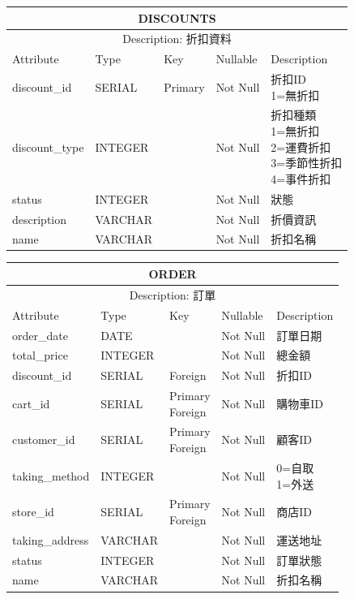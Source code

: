 \documentclass[a4paper, 12pt]{article}
\begin{document}
\noindent\begin{tabular}{ | p{7em} | p{5.5em} | p{5.5em} | p{4.5em} | p{11em} |}
  \hline
  \multicolumn{5}{|c|}{DISCOUNTS} \tabularnewline
  \hline 
  \multicolumn{5}{|c|}{Description: 折扣資料} \tabularnewline
  \hline 
  Attribute & Type & Key & Nullable & Description \\
  \hline
  discount_id & SERIAL & Primary & Not Null & \makecell[l]{折扣ID\\1=無折扣} \\
  \hline
  discount_type & INTEGER &  & Not Null & \makecell[l]{折扣種類\\1=無折扣\\2=運費折扣\\3=季節性折扣\\4=事件折扣} \\
  \hline
  status & INTEGER & &Not Null &狀態\\
  \hline
  description& VARCHAR &  &Not Null &折價資訊\\
  \hline
  name & VARCHAR &  &Not Null &折扣名稱\\
  \hline
\end{tabular}
\vspace{1em}

\noindent\begin{tabular}{ | p{7em} | p{5.5em} | p{5.5em} | p{4.5em} | p{11em} |}
  \hline
  \multicolumn{5}{|c|}{ORDER} \tabularnewline
  \hline 
  \multicolumn{5}{|c|}{Description: 訂單} \tabularnewline
  \hline 
  Attribute & Type & Key & Nullable & Description \\
  \hline
  order_date & DATE &  & Not Null & 訂單日期 \\
  \hline
  total_price & INTEGER &  & Not Null & 總金額 \\
  \hline
  discount_id & SERIAL & Foreign&Not Null &折扣ID\\
  \hline
  cart_id& SERIAL & \makecell[l]{Primary \\ Foreign} &Not Null &購物車ID\\
  \hline
  customer_id & SERIAL & \makecell[l]{Primary \\ Foreign} & Not Null & 顧客ID \\
  \hline
  taking_method & INTEGER &  & Not Null &  \makecell[l]{0=自取\\1=外送}\\
  \hline
  store_id & SERIAL & \makecell[l]{Primary \\ Foreign} & Not Null & 商店ID \\
  \hline
  taking_address & VARCHAR &  & Not Null & 運送地址 \\
  \hline
  status & INTEGER &  & Not Null & 訂單狀態 \\
  \hline
  
  name & VARCHAR &  &Not Null &折扣名稱\\
  \hline
\end{tabular}
\end{document}
